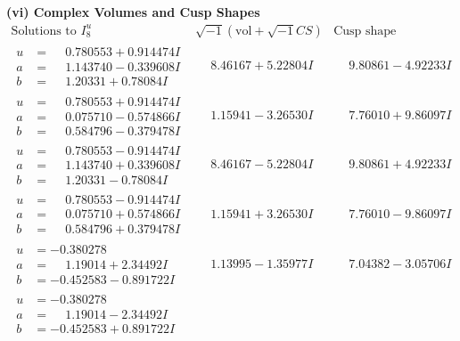 \documentclass[1p]{elsarticle_modified}
\theoremstyle{definition}
\newcommand{\I}{\sqrt{-1}}
\begin{document}
\newpage\flushleft \textbf{(vi) Complex Volumes and Cusp Shapes}
$$\begin{array}{c|c|c}  
\text{Solutions to }I^u_{8}& \I (\text{vol} + \sqrt{-1}CS) & \text{Cusp shape}\\
 \hline 
\begin{aligned}
u &= \phantom{-}0.780553 + 0.914474 I \\
a &= \phantom{-}1.143740 - 0.339608 I \\
b &= \phantom{-}1.20331 + 0.78084 I\end{aligned}
 & \phantom{-}8.46167 + 5.22804 I & \phantom{-}9.80861 - 4.92233 I \\ \hline\begin{aligned}
u &= \phantom{-}0.780553 + 0.914474 I \\
a &= \phantom{-}0.075710 - 0.574866 I \\
b &= \phantom{-}0.584796 - 0.379478 I\end{aligned}
 & \phantom{-}1.15941 - 3.26530 I & \phantom{-}7.76010 + 9.86097 I \\ \hline\begin{aligned}
u &= \phantom{-}0.780553 - 0.914474 I \\
a &= \phantom{-}1.143740 + 0.339608 I \\
b &= \phantom{-}1.20331 - 0.78084 I\end{aligned}
 & \phantom{-}8.46167 - 5.22804 I & \phantom{-}9.80861 + 4.92233 I \\ \hline\begin{aligned}
u &= \phantom{-}0.780553 - 0.914474 I \\
a &= \phantom{-}0.075710 + 0.574866 I \\
b &= \phantom{-}0.584796 + 0.379478 I\end{aligned}
 & \phantom{-}1.15941 + 3.26530 I & \phantom{-}7.76010 - 9.86097 I \\ \hline\begin{aligned}
u &= -0.380278\phantom{ +0.000000I} \\
a &= \phantom{-}1.19014 + 2.34492 I \\
b &= -0.452583 - 0.891722 I\end{aligned}
 & \phantom{-}1.13995 - 1.35977 I & \phantom{-}7.04382 - 3.05706 I \\ \hline\begin{aligned}
u &= -0.380278\phantom{ +0.000000I} \\
a &= \phantom{-}1.19014 - 2.34492 I \\
b &= -0.452583 + 0.891722 I\end{aligned}

\end{array}$$
\end{document}
